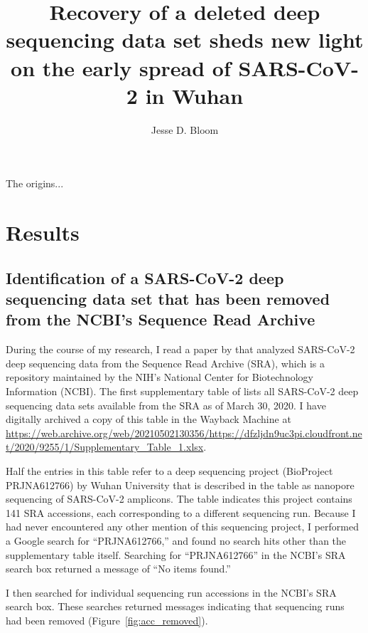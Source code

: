 \documentclass[9pt,twocolumn,twoside]{gsajnl_modified}
\title{Recovery of a deleted deep sequencing data set sheds new light on the early spread of SARS-CoV-2 in Wuhan}
\author[]{\Large Jesse D. Bloom}
\affil[]{Fred Hutchinson Cancer Research Center}
\affil[]{Howard Hughes Medical Institute}
\affil[]{Seattle, WA, USA}
\begin{document}
\maketitle
\thispagestyle{firststyle}
\firstpagefootnote

\vspace{-33pt}%

\lettrine[lines=2]{\color{color2}T}{}he origins... 

\section{Results}

\subsection{Identification of a SARS-CoV-2 deep sequencing data set that has been removed from the NCBI's Sequence Read Archive}
During the course of my research, I read a paper by \citet{farkas2020insights} that analyzed SARS-CoV-2 deep sequencing data from the Sequence Read Archive (SRA), which is a repository maintained by the NIH's National Center for Biotechnology Information (NCBI).
The first supplementary table of \citet{farkas2020insights} lists all SARS-CoV-2 deep sequencing data sets available from the SRA as of March 30, 2020.
I have digitally archived a copy of this table in the Wayback Machine at \url{https://web.archive.org/web/20210502130356/https://dfzljdn9uc3pi.cloudfront.net/2020/9255/1/Supplementary_Table_1.xlsx}. 

Half the entries in this table refer to a deep sequencing project (BioProject PRJNA612766) by Wuhan University that is described in the table as nanopore sequencing of SARS-CoV-2 amplicons.
The table indicates this project contains 141 SRA accessions, each corresponding to a different sequencing run.
Because I had never encountered any other mention of this sequencing project, I performed a Google search for ``PRJNA612766,'' and found no search hits other than the supplementary table itself.
Searching for ``PRJNA612766'' in the NCBI's SRA search box returned a message of ``No items found.''

I then searched for individual sequencing run accessions in the NCBI's SRA search box.
These searches returned messages indicating that sequencing runs had been removed (Figure~\ref{fig:acc_removed}).
\end{document}
